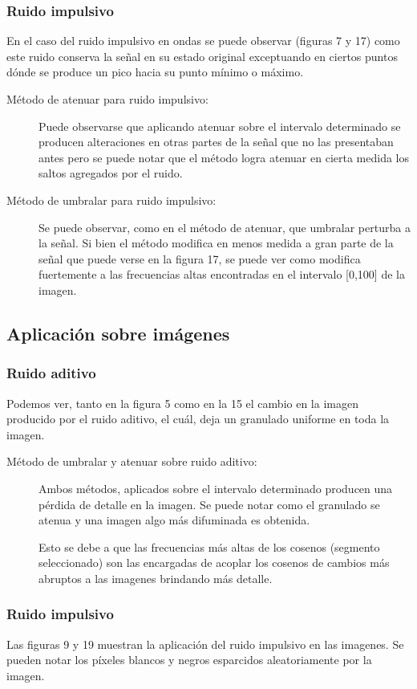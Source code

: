 \documentclass[a4paper,10pt,twoside]{article}
\begin{document}
\subsubsection{Ruido impulsivo}
En el caso del ruido impulsivo en ondas se puede observar (figuras 7 y 17) como este ruido conserva la señal en su estado original exceptuando en ciertos puntos dónde se produce un pico hacia su punto mínimo o máximo.
\begin{description}
\item[Método de atenuar para ruido impulsivo:]
Puede observarse que aplicando atenuar sobre el intervalo determinado se producen alteraciones en otras partes de la señal que no las presentaban antes pero se puede notar que el método logra atenuar en cierta medida los saltos agregados por el ruido.
\item[Método de umbralar para ruido impulsivo:]
Se puede observar, como en el método de atenuar, que umbralar perturba a la señal. Si bien el método modifica en menos medida a gran parte de la señal que puede verse en la figura 17, se puede ver como modifica fuertemente a las frecuencias altas encontradas en el intervalo [0,100] de la imagen.

\end{description}

\subsection{Aplicación sobre imágenes}
\subsubsection{Ruido aditivo}
Podemos ver, tanto en la figura 5 como en la 15 el cambio en la imagen producido por el ruido aditivo, el cuál, deja un granulado uniforme en toda la imagen.
\begin{description}
\item[Método de umbralar y atenuar sobre ruido aditivo:]
Ambos métodos, aplicados sobre el intervalo determinado producen una pérdida de detalle en la imagen. Se puede notar como el granulado se atenua y una imagen algo más difuminada es obtenida.

Esto se debe a que las frecuencias más altas de los cosenos (segmento seleccionado) son las encargadas de acoplar los cosenos de cambios más abruptos a las imagenes brindando más detalle.
\end{description}
\subsubsection{Ruido impulsivo}
Las figuras 9 y 19 muestran la aplicación del ruido impulsivo en las imagenes. Se pueden notar los píxeles blancos y negros esparcidos aleatoriamente por la imagen.
\end{document}

